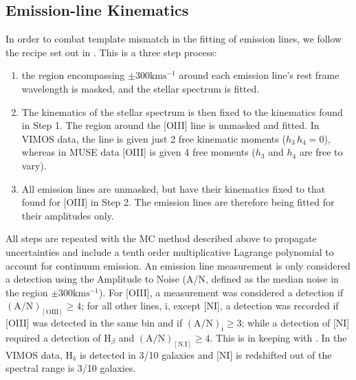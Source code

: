 	 \subsection{Emission-line Kinematics}
	 	In order to combat template mismatch in the fitting of emission lines, we follow the recipe set out in \citet{Sarzi2005}. This is a three step process:
		\begin{enumerate}
			\item the region encompassing $\pm 300 \mathrm{km s^{-1}}$ around each emission line's rest frame wavelength is masked, and the stellar spectrum is fitted.
			\item The kinematics of the stellar spectrum is then fixed to the kinematics found in Step 1. The region around the [OIII] line is unmasked and fitted. In VIMOS data, the line is given just 2 free kinematic moments ($h_3 \, h_4 = 0$), whereas in MUSE data [OIII] is given 4 free moments ($h_3$ and $h_4$ are free to vary). 
			\item All emission lines are unmasked, but have their kinematics fixed to that found for [OIII] in Step 2. The emission lines are therefore being fitted for their amplitudes only. 
		\end{enumerate}

		All steps are repeated with the MC method described above to propagate uncertainties and include a tenth order multiplicative Lagrange polynomial to account for continuum emission. An emission line measurement is only considered a detection using the Amplitude to Noise (A/N, defined as the median noise in the region $\pm 300 \mathrm{km s^{-1}}$). For [OIII], a measurement was considered a detection if $(\mathrm{A/N})_\mathrm{[OIII]} \ge 4$; for all other lines, i, except [NI], a detection was recorded if [OIII] was detected in the same bin and if $(\mathrm{A/N})_\mathrm{i} \ge 3$; while a detection of [NI] required a detection of H$_\beta$ and $(\mathrm{A/N})_\mathrm{[N.I]} \ge 4$. This is in keeping with \citet{Sarzi2005}. In the VIMOS data, H$_\mathrm{\delta}$ is detected in 3/10 galaxies and [NI] is redshifted out of the spectral range is 3/10 galaxies.





